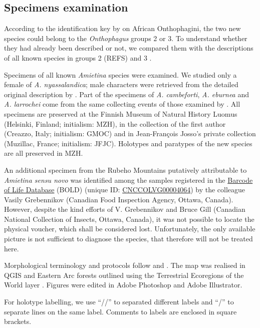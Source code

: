 \documentclass[fleqn,10pt,lineno]{wlpeerj}
\begin{document}
\subsection*{Specimens examination}
According to the identification key by \cite{orbigny1913synopsis} on African Onthophagini, the two new species could belong to the \textit{Onthophagus} groups 2 or 3. To understand whether they had already been described or not, we compared them with the descriptions of all known species in groups 2 (REFS) and 3 \citep{daniel2023dung}.

Specimens of all known \textit{Amietina} species were examined. We studied only a female of \textit{A. nyassalandica}; male characters were retrieved from the detailed original description by \cite{branco1988deux}. Part of the specimens of \textit{A. cambeforti}, \textit{A. eburnea} and \textit{A. larrochei} come from the same collecting events of those examined by \cite{branco1988deux}. 
All specimens are preserved at the Finnish Museum of Natural History Luomus (Helsinki, Finland; initialism: MZH), in the collection of the first author (Creazzo, Italy; initialism: GMOC) and in Jean-Fran\c{c}ois Josso's private collection (Muzillac, France; initialism: JFJC). Holotypes and paratypes of the new species are all preserved in MZH.

An additional specimen from the Rubeho Mountains putatively attributable to \textit{Amietina sensu novo} was identified among the samples registered in the \href{https://boldsystems.org/}{Barcode of Life Database} (BOLD) (unique ID: \href{https://boldsystems.org/index.php/Public_RecordView?processid=VGH254-12}{CNCCOLVG00004064}) by the colleague Vasily Grebennikov (Canadian Food Inspection Agency, Ottawa, Canada). However, despite the kind efforts of V. Grebennikov and Bruce Gill (Canadian National Collection of Insects, Ottawa, Canada), it was not possible to locate the physical voucher, which shall be considered lost. Unfortunately, the only available picture is not sufficient to diagnose the species, that therefore will not be treated here.

Morphological terminology and protocols follow \cite{montanaro2024computable} and \cite{tarasov2011phylogenetic}. The map was realised in QGIS \citep{QGIS_software} and Eastern Arc forests outlined using the Terrestrial Ecoregions of the World layer \citep{olson2001terrestrial}. Figures were edited in Adobe Photoshop and Adobe Illustrator.

For holotype labelling, we use “//” to separated different labels and “/” to separate lines on the same label. Comments to labels are enclosed in square brackets.
\end{document}

